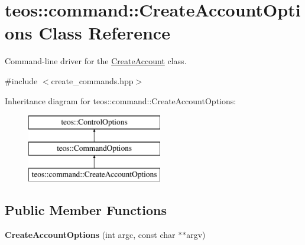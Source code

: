 \hypertarget{classteos_1_1command_1_1_create_account_options}{}\section{teos\+:\+:command\+:\+:Create\+Account\+Options Class Reference}
\label{classteos_1_1command_1_1_create_account_options}


Command-\/line driver for the \mbox{\hyperlink{classteos_1_1command_1_1_create_account}{Create\+Account}} class.  




{\ttfamily \#include $<$create\+\_\+commands.\+hpp$>$}

Inheritance diagram for teos\+:\+:command\+:\+:Create\+Account\+Options\+:\begin{figure}[H]
\begin{center}
\leavevmode
\includegraphics[height=3.000000cm]{classteos_1_1command_1_1_create_account_options}
\end{center}
\end{figure}
\subsection*{Public Member Functions}
\begin{DoxyCompactItemize}
\item 
\mbox{\label{classteos_1_1command_1_1_create_account_options_a885bd48ad537054b0541bcc82e2848c7}} 
{\bfseries Create\+Account\+Options} (int argc, const char $\ast$$\ast$argv)
\end{DoxyCompactItemize}
